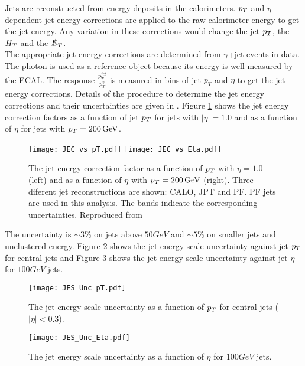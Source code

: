 Jets are reconstructed from energy deposits in the calorimeters. $p_{T}$ and
$\eta$ dependent jet energy corrections are applied to the raw calorimeter 
energy to get the jet energy. Any variation in these corrections would change 
the jet $p_{T}$, the $H_{T}$ and the $\slashed{E}_{T}$. \\

The appropriate jet energy corrections are determined from $\gamma$+jet events
in data. The photon is used as a reference object because its energy is well 
measured by the ECAL. The response $\frac{p_{T}^{jet}}{p_{T}^{\gamma}}$
is measured in bins of jet $p_{T}$ and $\eta$ to get the jet energy corrections. 
Details of the procedure to determine the jet energy corrections and their 
uncertainties are given in \cite{jec}. Figure \ref{fig:JEC_vs_pT_And_Eta} shows 
the jet energy correction factors as a function of jet $p_{T}$ for jets with 
$|\eta| = 1.0$ and as a function of $\eta$ for jets with $p_{T} = 200 \, \mathrm{GeV}$. 
\\

\begin{figure}
\texttt{[image: JEC\_vs\_pT.pdf]}
\texttt{[image: JEC\_vs\_Eta.pdf]}
\caption{The jet energy correction factor as a function of $p_{T}$ with $\eta =
1.0$ (left) and as a function of $\eta$ with $p_{T} = 200 \, \mathrm{GeV}$ (right). 
Three diferent jet reconstructions are shown: CALO, JPT and PF. PF jets are used 
in this analysis. The bands indicate the corresponding uncertainties. Reproduced
from \cite{jec}}
\label{fig:JEC_vs_pT_And_Eta}
\end{figure}

The uncertainty is $\sim 3 \unit{\%}$ on jets above $50 \unit{GeV}$ and $\sim 5 
\unit{\%}$ on smaller jets and unclustered energy. Figure \ref{fig:JES_Unc_pT} 
shows the jet energy scale uncertainty against jet $p_{T}$ for central jets and 
Figure \ref{fig:JES_Unc_Eta} shows the jet energy scale uncertainty against jet
$\eta$ for $100\unit{GeV}$ jets. \\

\begin{figure}
\begin{center}
\texttt{[image: JES\_Unc\_pT.pdf]}
\end{center}
\caption{The jet energy scale uncertainty as a function of $p_{T}$ for
central jets ($|\eta| < 0.3$).}
\label{fig:JES_Unc_pT}
\end{figure}

\begin{figure}
\begin{center}
\texttt{[image: JES\_Unc\_Eta.pdf]}
\end{center}
\caption{The jet energy scale uncertainty as a function of $\eta$ for
$100\unit{GeV}$ jets.}
\label{fig:JES_Unc_Eta}
\end{figure}

